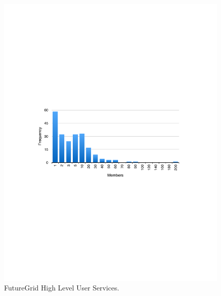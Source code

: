 \begin{figure}[htb]
  \centering
    \includegraphics[width=1.0\textwidth]{images/project-frequency.pdf}
  \caption{FutureGrid High Level User Services.}
\end{figure}

